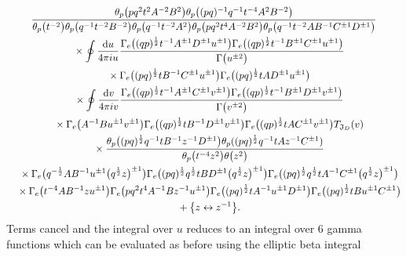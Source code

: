 \documentclass[a4paper,12pt]{article}
\begin{document}
\begin{gather*}
\frac{\theta_p\big(pq^2t^2A^{-2}B^2\big)
\theta_p\big((pq)^{-1}q^{-1}t^{-4}A^2B^{-2}\big)}
{\theta_p\big(t^{-2}\big)\theta_p\big(q^{-1}t^{-2}B^{-2}\big)\theta_p\big(q^{-1}t^{-2}A^2\big)\theta_p\big(pq^2t^4A^{-2}B^2\big)
\theta_p\big(q^{-1}t^{-2}AB^{-1}C^{\pm1}D^{\pm1}\big)}\\
\quad{}\times\oint\frac{{\rm d}u}{4\pi i u} \frac{\Gamma_e\big((q p)^{\frac12 }t^{-1} A^{\pm1} D^{\pm1}u^{\pm1}\big)
\Gamma_e\big((q p)^{\frac12 }t^{-1} B^{\pm1} C^{\pm1}u^{\pm1}\big)}{\Gamma\big(u^{\pm2}\big)}\\
\quad{}\times\Gamma_e\big((pq)^\frac12 t B^{-1} C^{\pm1}u^{\pm1}\big)
\Gamma_e\big((pq)^\frac12 t A D^{\pm1}u^{\pm1}\big)\nonumber\\
\quad{}\times\oint\frac{{\rm d}v}{4\pi i v} \frac{\Gamma_e\big((q p)^{\frac12 }t^{-1} A^{\pm1} C^{\pm1}v^{\pm1}\big)
\Gamma_e\big((q p)^{\frac12 }t^{-1} B^{\pm1} D^{\pm1}v^{\pm1}\big)}{\Gamma\big(v^{\pm2}\big)}\\
\quad{}\times\Gamma_e\big( A^{-1}B u^{\pm1} v^{\pm1}\big)\Gamma_e\big((qp)^{\frac12}t B^{-1}D^{\pm1} v^{\pm1}\big)
\Gamma_e\big((q p)^{\frac12}t A C^{\pm1} v^{\pm1}\big)T_{{\mathfrak J}_D}(v)\\
\quad{}\times\frac{\theta_p\big((pq)^\frac{1}{2}q^{-1}tB^{-1}z^{-1}D^{\pm1}\big)
\theta_p((pq)^\frac{1}{2}q^{-1}tAz^{-1}C^{\pm1})}
{\theta_p\big(t^{-4}z^2\big)\theta\big(z^2\big)}\\
\quad{}\times\Gamma_e\big(q^{-\frac{1}{2}}A B^{-1}u^{\pm1}\big(q^\frac{1}{2}z\big)^{\pm1}\big)
\Gamma_e\big((pq)^\frac{1}{2}q^\frac{1}{2}t B D^{\pm1}\big(q^\frac{1}{2}z\big)^{\pm1}\big)
\Gamma_e\big((pq)^{\frac{1}{2}}q^\frac{1}{2}tA^{-1}C^{\pm1}\big(q^\frac{1}{2}z\big)^{\pm1}\big)\\
\quad{}\times\Gamma_e\big(t^{-4}AB^{-1}zu^{\pm1}\big)\Gamma_e\big(pq^2 t^4 A^{-1}B z^{-1}u^{\pm1}\big)
\Gamma_e\big((pq)^\frac{1}{2}tA^{-1}u^{\pm1}D^{\pm1}\big)
\Gamma_e\big((pq)^\frac{1}{2}t B u^{\pm1}C^{\pm1}\big)\\
\quad{}+\big\{z\leftrightarrow z^{-1}\big\} .
\end{gather*}
Terms cancel and the integral over $u$ reduces to an integral over 6 gamma functions which can be evaluated as before using the elliptic beta integral
\end{document}
